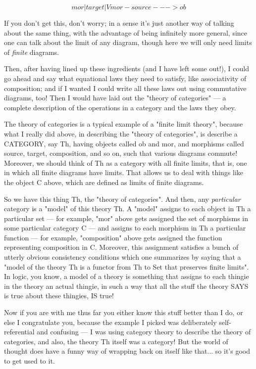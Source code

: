 $$

                                 mor
                                  |
                               target
                                  |
                                  V
                  mor -source---> ob 
$$
    

If you don't get this, don't worry; in a sense it's just another way 
of talking about the same thing, with the advantage of being 
infinitely more general, since one can talk about the limit of 
any diagram, though here we will only need limits of \emph{finite}
diagrams.

Then, after having lined up these ingredients (and I have left some 
out!), I could go ahead and say what equational laws they need 
to satisfy, like associativity of composition; and if I wanted I 
could write all these laws out using commutative diagrams, too!  
Then I would have laid out the "theory of categories" --- 
a complete description of the operations in a category and the laws they obey.  

The theory of categories is a typical example of a "finite limit 
theory", because what I really did above, in describing
the "theory of categories", is describe a CATEGORY, say Th, having
objects called ob and mor, and morphisms called source, target, composition,
and so on, such that various diagrams commute!   Moreover, we should
think of Th as a category with all finite limits, that is, one in which
all finite diagrams have limits.  That allows us to deal with things
like the object C above, which are defined as limits of finite
diagrams.

So we have this thing Th, the "theory of categories".  And then, 
any \emph{particular} category is a "model" of this theory Th.
A "model" assigns to each object in Th a particular
set --- for example, "mor" above gets assigned
the set of morphisms in some particular category C --- and assigns to each
morphism in Th a particular function --- for example,  
"composition" above gets assigned the function representing composition
in C.  Moreover, this assignment satisfies a bunch of utterly obvious 
consistency conditions which one summarizes by saying that a 
"model of the theory Th is a functor from Th to Set that preserves 
finite limits".  In logic, you know, a model of a theory is something 
that assigns to each thingie in the theory an actual thingie, in such a 
way that all the stuff the theory SAYS is true about these thingies, 
IS true!

Now if you are with me thus far you either know this stuff better
than I do, or else I congratulate you, because the example I 
picked was deliberately self-referential and confusing --- I was
using category theory to describe the theory of categories, and also,
the theory Th itself was a category!  But the world of thought does have
a funny way of wrapping back on itself like that... so it's good
to get used to it.


